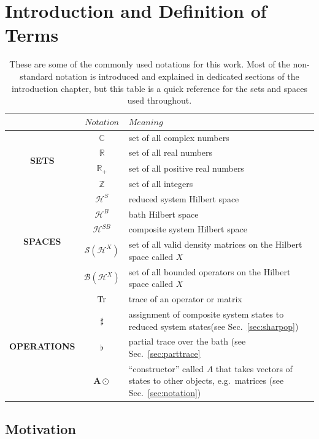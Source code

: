 \chapter{Introduction and Definition of Terms}

\begin{table}[h!t]
\centering
\begin{tabular}{c|cp{9cm}}
\toprule
&$Notation$ & $Meaning$ \\
\midrule
\multirow{4}{*}{{\bf SETS}}&$\mathbb{C}$ & set of all complex numbers\\
&$\mathbb{R}$ & set of all real numbers\\
&$\mathbb{R_+}$ & set of all positive real numbers\\
&$\mathbb{Z}$ & set of all integers\\
\midrule
\multirow{5}{*}{{\bf SPACES}}&$\mathcal{H}^S$ & reduced system Hilbert space\\
&$\mathcal{H}^B$ & bath Hilbert space\\
&$\mathcal{H}^{SB}$ & composite system Hilbert space\\
&$\mathcal{S}(\mathcal{H}^X)$ & set of all valid density matrices on the Hilbert space called $X$\\
&$\mathcal{B}(\mathcal{H}^X)$ & set of all bounded operators on the Hilbert space called $X$\\
\midrule
\multirow{4}{*}{{\bf OPERATIONS}}&$\operatorname{Tr}$ & trace of an operator or matrix\\
&$\sharp$ & assignment of composite system states to reduced system states(see Sec.\ \ref{sec:sharpop})\\
&$\flat$ & partial trace over the bath (see Sec.\ \ref{sec:parttrace}\\
&$\mathbf{A}\odot$ & ``constructor'' called $A$ that takes vectors of states to other objects, e.g.\ matrices (see Sec.\ \ref{sec:notation})\\
\bottomrule
\end{tabular}
\caption{These are some of the commonly used notations for this work.  Most of the non-standard notation is introduced and explained in dedicated sections of the introduction chapter, but this table is a quick reference for the sets and spaces used throughout.}
\label{tab:note}
\end{table}


\section{Motivation}


